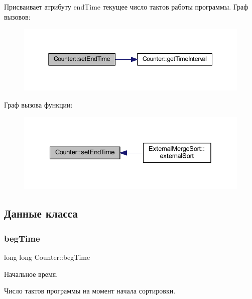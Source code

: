 Присваивает атрибуту end\+Time текущее число тактов работы программы. Граф вызовов\+:\nopagebreak
\begin{figure}[H]
\begin{center}
\leavevmode
\includegraphics[width=345pt]{class_counter_a563ab520e0e9ea20d4d4d113f566658a_cgraph}
\end{center}
\end{figure}
Граф вызова функции\+:\nopagebreak
\begin{figure}[H]
\begin{center}
\leavevmode
\includegraphics[width=328pt]{class_counter_a563ab520e0e9ea20d4d4d113f566658a_icgraph}
\end{center}
\end{figure}


\subsection{Данные класса}
\hypertarget{class_counter_ae2f8fa6947d7daa4b977d4aae2ee3c43}{}\label{class_counter_ae2f8fa6947d7daa4b977d4aae2ee3c43} 
\subsubsection{\texorpdfstring{beg\+Time}{begTime}}
{\footnotesize\ttfamily long long Counter\+::beg\+Time\hspace{0.3cm}{\ttfamily [private]}}



Начальное время. 

Число тактов программы на момент начала сортировки. \hypertarget{class_counter_a20f5a772c02412c338457dcc85c4a543}{}\label{class_counter_a20f5a772c02412c338457dcc85c4a543} 

